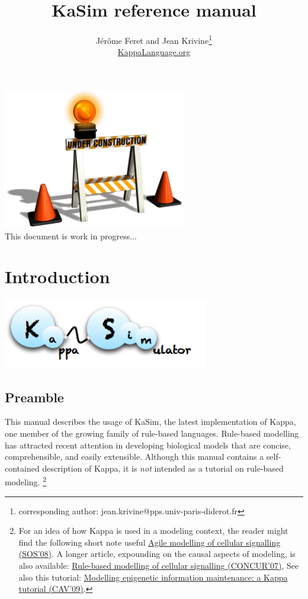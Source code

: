 \documentclass[11pt]{book}
\title{KaSim reference manual \version}
\author{J\'er\^ome Feret and Jean Krivine\thanks{corresponding author: jean.krivine@pps.univ-paris-diderot.fr} \\\url{KappaLanguage.org}}
\def\KaSim{\textsf{KaSim}}
\begin{document}
\maketitle

\begin{center}\includegraphics[width=80mm]{img/wip.jpg}
\vspace{3cm}
\\This document is work in progress...
\end{center}

\tableofcontents
\listoftables

\chapter{Introduction}
\begin{center}\includegraphics[width=9cm]{img/KaSim-logo.png}\end{center}

\section{Preamble}
This manual describes the usage of \KaSim, the latest implementation of Kappa, one member of the growing family of rule-based languages. Rule-based modelling has attracted recent attention in developing biological models that are concise, comprehensible, and easily extensible. 
Although this manual contains a self-contained description of Kappa, it is \emph{not} intended as a tutorial on rule-based modeling.%
%
\footnote{For an idea of how Kappa is used in a modeling context, the reader might find the following short note useful \href{http://www.pps.jussieu.fr/~danos/pdf/eov.pdf}{Agile modelling of cellular signalling (SOS'08)}. A longer article, expounding on the causal aspects of modeling, is also available: \href{http://www.pps.jussieu.fr/~danos/pdf/ka-fix.pdf}{Rule-based modelling of cellular signalling (CONCUR'07)}, See also this tutorial: \href{http://www.pps.jussieu.fr/~danos/pdf/mytdg.pdf}{Modelling epigenetic information maintenance: a Kappa tutorial (CAV'09)}. 
}%
\end{document}
